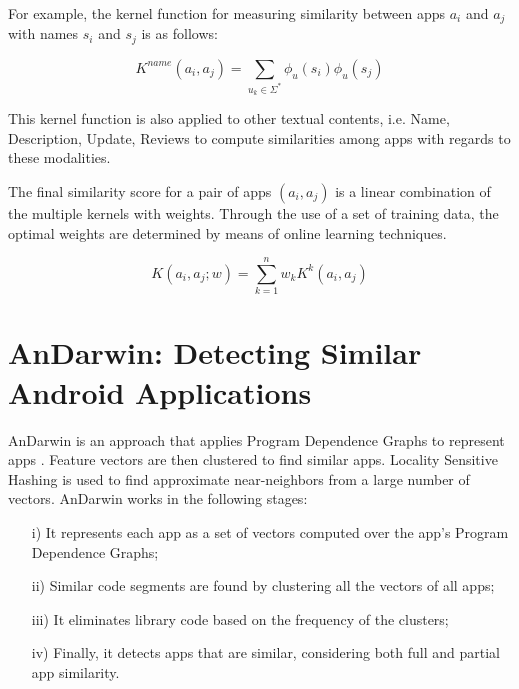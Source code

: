 For example, the kernel function for measuring similarity between apps $a_{i}$ and $a_{j}$ with names $s_{i}$ and $s_{j}$ is as follows:

\begin{equation}
K^{name}(a_i,a_j) = \sum_{u_k\in \Sigma^{*}} \phi_{u}(s_{i})\phi_{u}(s_{j})
\end{equation}

This kernel function is also applied to other textual contents, i.e. Name, Description, Update, Reviews to compute similarities among apps with regards to these modalities.

The final similarity score for a pair of apps $(a_{i},a_{j})$ is a linear combination of the multiple kernels with weights. Through the use of a set of training data, the optimal weights are determined by means of online learning techniques. 

\begin{equation}
K(a_{i},a_{j};w)= \sum_{k=1}^n{w_{k}K^k(a_{i},a_{j})}
\end{equation}



\section{AnDarwin: Detecting Similar Android Applications}\label{sec:andarwin}

AnDarwin is an approach that applies Program Dependence Graphs to represent apps \cite{Crussell2013}. Feature vectors are then clustered to find similar apps. Locality Sensitive Hashing is used to find approximate near-neighbors from a large number of vectors. AnDarwin works in the following stages:

\begin{itemize}
	\item[i)] It represents each app as a set of vectors computed over the app's Program Dependence Graphs; %
	\item[ii)] Similar code segments are found by clustering all the vectors of all apps;%
	\item[iii)] It eliminates library code based on the frequency of the clusters;%
	\item[iv)] Finally, it detects apps that are similar, considering both full and partial app similarity.%
\end{itemize}

